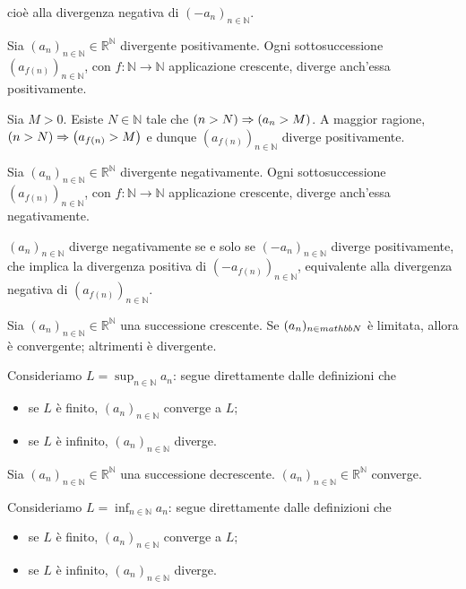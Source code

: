 cio\`e alla divergenza negativa di $(- a_n)_{n \in \mathbb{N}}$. \EndProof
\begin{Theorem}
	Sia $(a_n)_{n \in \mathbb{N}} \in \mathbb{R}^\mathbb{N}$ divergente
  positivamente. Ogni sottosuccessione $(a_{f(n)})_{n \in \mathbb{N}}$,
  con $f: \mathbb{N} \rightarrow \mathbb{N}$ applicazione crescente,
  diverge anch'essa positivamente.
\end{Theorem}
\Proof Sia $M > 0$. Esiste $N \in \mathbb{N}$ tale che
$\left ( n > N \right ) \Rightarrow \left ( a_n > M \right )$. A maggior ragione,
$\left ( n > N \right ) \Rightarrow \left ( a_{f(n)} > M \right )$ e dunque $(a_{f(n)})_{n \in \mathbb{N}}$
diverge positivamente. \EndProof
\begin{Corollary}
	Sia $(a_n)_{n \in \mathbb{N}} \in \mathbb{R}^\mathbb{N}$ divergente
  negativamente. Ogni sottosuccessione $(a_{f(n)})_{n \in \mathbb{N}}$,
  con $f: \mathbb{N} \rightarrow \mathbb{N}$ applicazione crescente,
  diverge anch'essa negativamente.
\end{Corollary}
\Proof $(a_n)_{n \in \mathbb{N}}$ diverge negativamente se e solo se
$(- a_n)_{n \in \mathbb{N}}$ diverge positivamente, che implica la divergenza
positiva di $(- a_{f(n)})_{n \in \mathbb{N}}$, equivalente alla divergenza
negativa di $(a_{f(n)})_{n \in \mathbb{N}}$. \EndProof
\begin{Theorem}
	Sia $(a_n)_{n \in \mathbb{N}} \in \mathbb{R}^\mathbb{N}$ una successione
  crescente.
  Se $(a_n)_{n \in \\mathbb{N}}$ \`e limitata, allora \`e convergente;
  altrimenti \`e divergente.
\end{Theorem}
\Proof Consideriamo $L = \sup_{n \in \mathbb{N}} a_n$: segue direttamente dalle
definizioni che
\begin{itemize}
	\item se $L$ \`e finito, $(a_n)_{n \in \mathbb{N}}$ converge a $L$;
	\item se $L$ \`e infinito, $(a_n)_{n \in \mathbb{N}}$ diverge. \EndProof
\end{itemize}
\begin{Theorem}
	Sia $(a_n)_{n \in \mathbb{N}} \in \mathbb{R}^\mathbb{N}$ una successione
  decrescente.
  $(a_n)_{n \in \mathbb{N}} \in \mathbb{R}^\mathbb{N}$ converge.
\end{Theorem} 
\Proof Consideriamo $L = \inf_{n \in \mathbb{N}} a_n$: segue direttamente dalle
definizioni che
\begin{itemize}
	\item se $L$ \`e finito, $(a_n)_{n \in \mathbb{N}}$ converge a $L$;
	\item se $L$ \`e infinito, $(a_n)_{n \in \mathbb{N}}$ diverge. \EndProof
\end{itemize}

